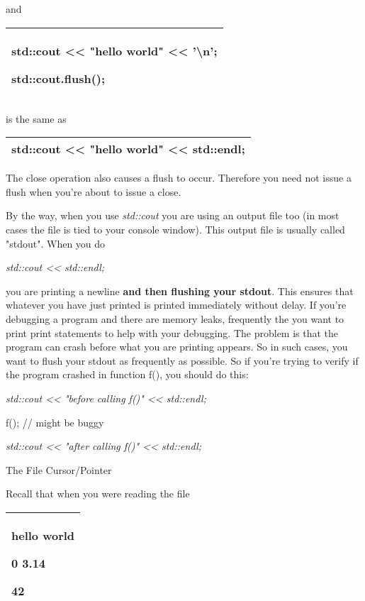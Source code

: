 \documentclass[
]{article}
\begin{document}
and

\begin{longtable}[]{@{}l@{}}
\toprule
\endhead
\begin{minipage}[t]{0.97\columnwidth}\raggedright
std::cout \textless\textless{} "hello world" \textless\textless{}
'\textbackslash n';

std::cout.flush();\strut
\end{minipage}\tabularnewline
\bottomrule
\end{longtable}

is the same as

\begin{longtable}[]{@{}l@{}}
\toprule
\endhead
std::cout \textless\textless{} "hello world" \textless\textless{}
std::endl;\tabularnewline
\bottomrule
\end{longtable}

The close operation also causes a flush to occur. Therefore you need not
issue a flush when you're about to issue a close.

By the way, when you use \emph{std::cout} you are using an output file
too (in most cases the file is tied to your console window). This output
file is usually called "stdout". When you do

\emph{std::cout \textless\textless{} std::endl;}

you are printing a newline \textbf{and then flushing your stdout}. This
ensures that whatever you have just printed is printed immediately
without delay. If you're debugging a program and there are memory leaks,
frequently the you want to print print statements to help with your
debugging. The problem is that the program can crash before what you are
printing appears. So in such cases, you want to flush your stdout as
frequently as possible. So if you're trying to verify if the program
crashed in function f(), you should do this:

\emph{std::cout \textless\textless{} "before calling f()"
\textless\textless{} std::endl;}

f(); // might be buggy

\emph{std::cout \textless\textless{} "after calling f()"
\textless\textless{} std::endl;}

The File Cursor/Pointer

Recall that when you were reading the file

\begin{longtable}[]{@{}l@{}}
\toprule
\endhead
\begin{minipage}[t]{0.97\columnwidth}\raggedright
hello world

0 3.14

42\strut
\end{minipage}\tabularnewline
\bottomrule
\end{longtable}
\end{document}
